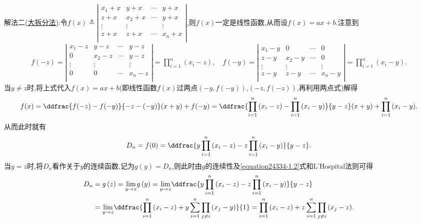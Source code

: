 \documentclass[../../main.tex]{subfiles}
\begin{document}
\begin{solution}
{\color{blue}解法二\hyperref[大拆分法]{(大拆分法)}:}令$f(x) \triangleq \left| \begin{matrix}
x_1+x & y+x & \cdots & y+x \\
z+x & x_2+x & \cdots & y+x \\
\vdots & \vdots & & \vdots \\
z+x & z+x & \cdots & x_n+x \\
\end{matrix} \right|$,则$f(x)$一定是线性函数,从而设$f(x) =ax+b$.注意到
\begin{align*}
f(-z) =\left| \begin{matrix}
x_1-z & y-z & \cdots & y-z \\
0 & x_2-z & \cdots & y-z \\
\vdots & \vdots & & \vdots \\
0 & 0 & \cdots & x_n-z \\
\end{matrix} \right|=\prod_{i=1}^n{(x_i-z)},\quad f(-y) =\left| \begin{matrix}
x_1-y & 0 & \cdots & 0 \\
z-y & x_2-y & \cdots & 0 \\
\vdots & \vdots & & \vdots \\
z-y & z-y & \cdots & x_n-y \\
\end{matrix} \right|=\prod_{i=1}^n{(x_i-y)}.
\end{align*}
当$y\ne z$时,将上式代入$f(x) =ax+b$(即线性函数$f(x)$过两点$(-y,f(-y))$,$(-z,f(-z))$,再利用两点式)解得
\begin{align*}
f(x) =\ddfrac{f(-z) -f(-y)}{-z-(-y)}(x+y) +f(-y) =\ddfrac{\prod_{i=1}^n{(x_i-z)}-\prod_{i=1}^n{(x_i-y)}}{y-z}(x+y) +\prod_{i=1}^n{(x_i-y)}.
\end{align*}
从而此时就有
\begin{align}
D_n=f(0) =\ddfrac{y\prod_{i=1}^n{(x_i}-z)-z\prod_{i=1}^n{(x_i}-y)}{y-z}.\label{equation24334-1.2}
\end{align}
当$y=z$时,将$D_n$看作关于$y$的连续函数,记为$g(y) =D_n$,则此时由$g$的连续性及\eqref{equation24334-1.2}式和L'Hospital法则可得
\begin{align*}
D_n&=g\left( z \right) =\underset{y\rightarrow z}{\lim}g\left( y \right) =\underset{y\rightarrow z}{\lim}\ddfrac{y\prod_{i=1}^n{(x_i}-z)-z\prod_{i=1}^n{(x_i}-y)}{y-z}
\\
&=\underset{y\rightarrow z}{\lim}\ddfrac{\prod_{i=1}^n{(x_i}-z)+y\sum_{i=1}^n{\prod_{j\ne i}{(x_j}}-y)}{1}=\prod_{i=1}^n{(x_i}-z)+z\sum_{i=1}^n{\prod_{j\ne i}{(x_j}}-z).
\end{align*}
\end{solution}
\end{document}
